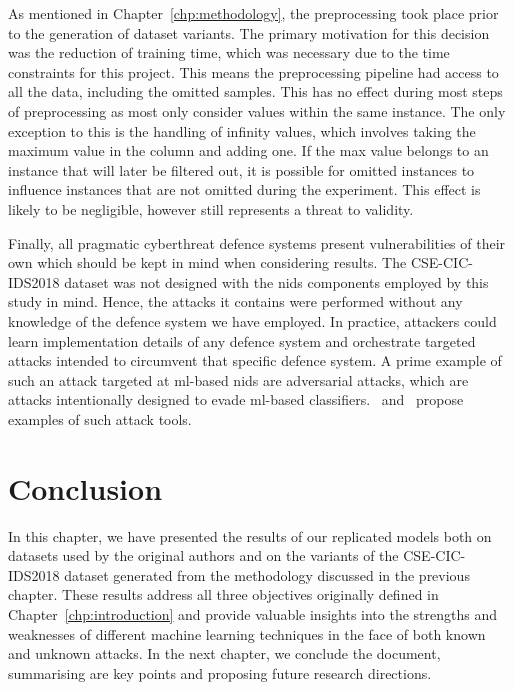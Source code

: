 As mentioned in Chapter~\ref{chp:methodology}, the preprocessing took place
prior to the generation of dataset variants. The primary motivation for this
decision was the reduction of training time, which was necessary due to the
time constraints for this project. This means the preprocessing pipeline had
access to all the data, including the omitted samples. This has no effect
during most steps of preprocessing as most only consider values within the same
instance. The only exception to this is the handling of infinity values, which
involves taking the maximum value in the column and adding one. If the max
value belongs to an instance that will later be filtered out, it is possible
for omitted instances to influence instances that are not omitted during the
experiment. This effect is likely to be negligible, however still represents a
threat to validity.

Finally, all pragmatic cyberthreat defence systems present vulnerabilities of
their own which should be kept in mind when considering results. The
CSE-CIC-IDS2018 dataset was not designed with the \gls{nids} components
employed by this study in mind. Hence, the attacks it contains were performed
without any knowledge of the defence system we have employed. In practice,
attackers could learn implementation details of any defence system and
orchestrate targeted attacks intended to circumvent that specific defence
system. A prime example of such an attack targeted at \gls{ml}-based \gls{nids}
are adversarial attacks, which are attacks intentionally designed to evade
\gls{ml}-based classifiers.~\cite{adversarial1} and~\cite{adversarial2} propose
examples of such attack tools.

\section{Conclusion}%
\label{sec:conclusion4}

In this chapter, we have presented the results of our replicated models both on
datasets used by the original authors and on the variants of the
CSE-CIC-IDS2018 dataset generated from the methodology discussed in the
previous chapter. These results address all three objectives originally defined
in Chapter~\ref{chp:introduction} and provide valuable insights into the
strengths and weaknesses of different machine learning techniques in the face
of both known and unknown attacks. In the next chapter, we conclude the
document, summarising are key points and proposing future research directions.